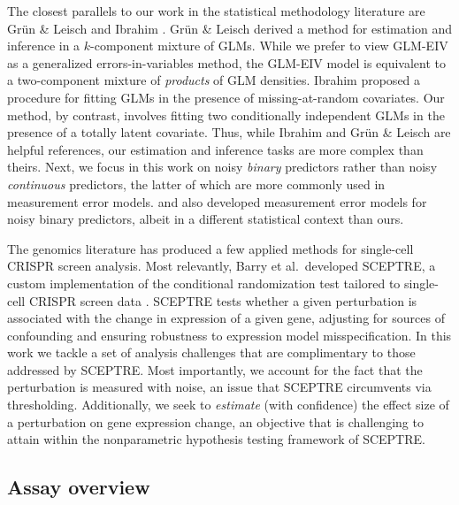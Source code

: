 \documentclass[12pt]{article}
\begin{document}
The closest parallels to our work in the statistical methodology literature are Gr\"{u}n \& Leisch \parencite{Grun2008} and Ibrahim \parencite{Ibrahim1990}. Gr\"{u}n \& Leisch derived a method for estimation and inference in a $k$-component mixture of GLMs. While we prefer to view GLM-EIV as a generalized errors-in-variables method,  the GLM-EIV model is equivalent to a two-component mixture of \textit{products} of GLM densities. Ibrahim proposed a procedure for fitting GLMs in the presence of missing-at-random covariates. Our method, by contrast, involves fitting two conditionally independent GLMs in the presence of a totally latent covariate. Thus, while Ibrahim and Gr\"{u}n \& Leisch are helpful references, our estimation and inference tasks are more complex than theirs. Next, we focus in this work on noisy \textit{binary} predictors rather than noisy \textit{continuous} predictors, the latter of which are more commonly used in measurement error models. \parencite{Aigner1973} and \parencite{Savoca2000} also developed measurement error models for noisy binary predictors, albeit in a different statistical context than ours.

The genomics literature has produced a few applied methods for single-cell CRISPR screen analysis. Most relevantly, Barry et al.\ developed SCEPTRE, a custom implementation of the conditional randomization test \parencite{Candes2018, Liu2021} tailored to single-cell CRISPR screen data \parencite{Barry2021}. SCEPTRE tests whether a given perturbation is associated with the change in expression of a given gene, adjusting for sources of confounding and ensuring robustness to expression model misspecification. In this work we tackle a set of analysis challenges that are complimentary to those addressed by SCEPTRE. Most importantly, we account for the fact that the perturbation is measured with noise, an issue that SCEPTRE circumvents via thresholding. Additionally, we seek to \textit{estimate} (with confidence) the effect size of a perturbation on gene expression change, an objective that is challenging to attain within the nonparametric hypothesis testing framework of SCEPTRE.


\subsection{Assay overview}
\end{document}
